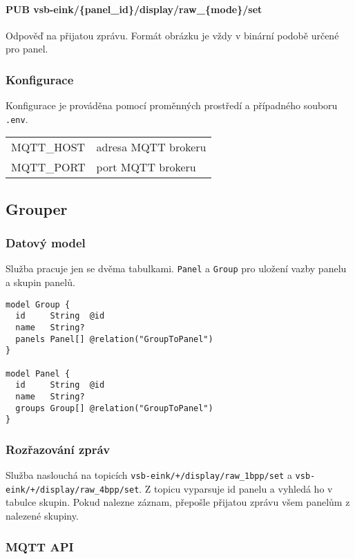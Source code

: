 \paragraph*{PUB vsb-eink/\{panel\_id\}/display/raw\_\{mode\}/set}
Odpověď na přijatou zprávu. Formát obrázku je vždy v binární podobě určené pro panel.

\subsubsection{Konfigurace}
Konfigurace je prováděna pomocí proměnných prostředí a případného souboru \lstinline{.env}.
\begin{table}[h]
    \begin{tabular}{ll}
        MQTT\_HOST & adresa MQTT brokeru \\
        MQTT\_PORT & port MQTT brokeru \\
    \end{tabular}
\end{table}

\subsection{Grouper}
\subsubsection{Datový model}
Služba pracuje jen se dvěma tabulkami. \lstinline|Panel| a \lstinline|Group| pro uložení vazby panelu a skupin panelů.

\begin{lstlisting}[label=src:grouper-schema,caption={Schém}]
model Group {
  id     String  @id
  name   String?
  panels Panel[] @relation("GroupToPanel")
}

model Panel {
  id     String  @id
  name   String?
  groups Group[] @relation("GroupToPanel")
}
\end{lstlisting}

\subsubsection{Rozřazování zpráv}
Služba naslouchá na topicích \lstinline|vsb-eink/+/display/raw_1bpp/set| a \lstinline|vsb-eink/+/display/raw_4bpp/set|. Z topicu vyparsuje id panelu a vyhledá ho v tabulce skupin. Pokud nalezne záznam, přepošle přijatou zprávu všem panelům z nalezené skupiny.

\subsubsection{MQTT API}
